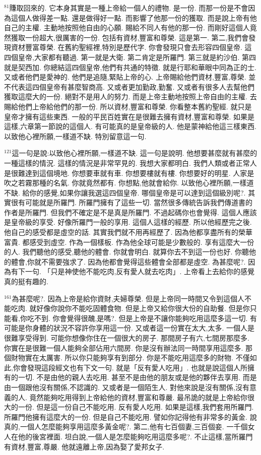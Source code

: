 \documentclass{book}
\begin{document}
$^{81}$賺取回來的.
它本身其實是一種上帝給一個人的禮物.
是一份.
而那一份是不會因為這個人做得差一點.
還是做得好一點.
而影響了他那一份的獲取.
而是說上帝有他自己的主權.
主動地按照他自由的心願.
賜給不同人有他的那一份.
而剛好這個人竟然獲取一份超大,很厲害的一份.
包括有資材,豐富和尊榮.
這是第一.
第二,我們會發現資材豐富尊榮.
在舊約聖經裡,特別是歷代字.
你會發現只會去形容四個皇帝.
這四個皇帝,大家都有聽過.
第一就是大衛.
第二肯定是所羅門.
第三就是約沙伯.
第四就是契西加.
你總結這四個皇帝,他們有共通的特徵.
就是行耶和華眼中同為正的士.
又或者他們是愛神的.
他們是追隨,緊貼上帝的心.
上帝賜給他們資材,豐富,尊榮.
並不代表這四個皇帝有甚麼智商高.
又或者更加勤政,勤奮.
又或者有很多人去幫他們獲取這麼大的一份.
絕對不是用人的努力.
而是上帝主動地按照上帝自由的主權.
去賜給他們上帝給他們的那一份.
所以資材,豐富和尊榮.
你看整本舊約聖經.
就只是皇帝才擁有這些東西.
一般的平民百姓實在是很難去擁有資材,豐富和尊榮.
如果是這樣,六章第一節說的這個人.
有可能真的是皇帝級的人.
他是蒙神給他這三樣東西.
以致他心裡所願,一樣道不缺.
特別留意這一句.

$^{121}$這一句是說:以致他心裡所願,一樣道不缺.
這一句是說明.
他想要甚麼就有甚麼的一種這樣的情況.
這樣的情況是非常罕見的.
我想大家都明白.
我們人類或者正常人是很難達到這個境地.
你想要車就有車.
你想要樓就有樓.
你想要好的明星.
人家是吹之若霧那種的名氣.
你就竟然都有.
你想點,他就會給你.
以致他心裡所願,一樣道不缺.
給你的感覺,如果你讓我選這四個皇帝.
哪個皇帝是可以達到這個級別呢?.
其實很有可能就是所羅門.
所羅門擁有了這些一切.
當然很多傳統告訴我們傳道書的作者是所羅門.
但我們不確定是不是真是所羅門.
不過起碼你也會覺得.
這個人應該是皇帝級的享受.
好像所羅門一般的享用.
這個人這樣的經歷.
所以他經歷完之後.
他自己的感受都是虛空的話.
其實我們就不用再經歷了.
因為他都享盡所有的榮華富貴.
都感受到虛空.
作為一個樣板.
作為他全球可能是少數般的.
享有這麼大一份的人.
我們聽他的感受,聽他的體會.
你就會明白.
就算你去不到這一份也好.
你聽他的體會,你就不需要強求了.
因為他都會覺得這些體會全部都是虛空.
為甚麼呢?.
因為有下一句.
「只是神使他不能吃肉,反有愛人就去吃肉」.
上帝看上去給你的感覺真的挺有趣的.

$^{161}$為甚麼呢?.
因為上帝是給你資財,夫婦尊榮.
但是上帝同一時間又令到這個人不能吃肉.
就好像你說你不能吃固體食物.
但是上帝又給你很大份的自助餐.
但是你只能看,你吃不到.
你會覺得很醜,是嗎?.
但是上帝是不讓你能夠吃用這麼多這一切.
有可能是你身體的狀況不容許你享用這一份.
又或者這一份實在太大,太多.
一個人是很難享受得到.
可能你想像你住在一個很大的房子.
那間房子有六,七間房那麼多.
你實在是很難一個人能夠全部佔用六間房.
你是沒有辦法同一時間享用這麼多.
那個財物實在太厲害.
所以你只能夠享有到部分.
你是不能吃用這麼多的財物.
不僅如此,你會發現這段經文也有下文一句.
就是「反有愛人吃用」.
也就是說這個人所擁有的一切.
不是由他的親人去吃用.
甚至不是由他的朋友或是他的夥伴去享用.
而是由一個跟他沒有關係,不認識的.
又或者是一個陌生人.
對他來說是沒有關係,沒有意義的人.
竟然能夠吃用得到上帝給他的資材,豐富和尊嚴.
最吊詭的就是上帝給你很大的一份.
但是這一份自己不能吃用.
反有愛人吃用.
如果是這樣,我們套用所羅門.
所羅門他擁有這麼大的一份.
但是自己不能吃用.
譬如你記得他有非常多的黃金.
說真的,一個人怎麼能夠享用這麼多黃金呢?.
第二,他有七百個妻,三百個妾.
一千個女人在他的後宮裡面.
坦白說,一個人是怎麼能夠吃用這麼多呢?.
不止這樣,當所羅門有資材,豐富,尊嚴.
他就遠離上帝,因為娶了愛邦女子.
\end{document}
